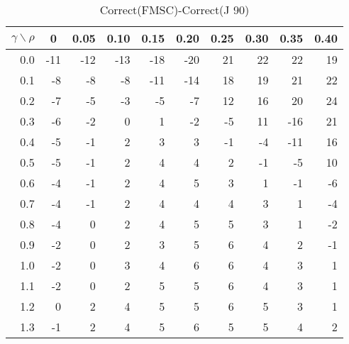 \documentclass[12pt]{article}
\begin{document}
%
\begin{table}[!tbp]
\caption{Correct(FMSC)-Correct(J 90)}
 \begin{center}
 \begin{tabular}{r|rrrrrrrrr}\hline\hline
\multicolumn{1}{c|}{$\gamma\backslash\rho$}&\multicolumn{1}{c}{0}&\multicolumn{1}{c}{0.05}&\multicolumn{1}{c}{0.10}&\multicolumn{1}{c}{0.15}&\multicolumn{1}{c}{0.20}&\multicolumn{1}{c}{0.25}&\multicolumn{1}{c}{0.30}&\multicolumn{1}{c}{0.35}&\multicolumn{1}{c}{0.40}\tabularnewline
\hline
0.0&-11&-12&-13&-18&-20&21&22& 22&19\tabularnewline
0.1& -8& -8& -8&-11&-14&18&19& 21&22\tabularnewline
0.2& -7& -5& -3& -5& -7&12&16& 20&24\tabularnewline
0.3& -6& -2&  0&  1& -2&-5&11&-16&21\tabularnewline
0.4& -5& -1&  2&  3&  3&-1&-4&-11&16\tabularnewline
0.5& -5& -1&  2&  4&  4& 2&-1& -5&10\tabularnewline
0.6& -4& -1&  2&  4&  5& 3& 1& -1&-6\tabularnewline
0.7& -4& -1&  2&  4&  4& 4& 3&  1&-4\tabularnewline
0.8& -4&  0&  2&  4&  5& 5& 3&  1&-2\tabularnewline
0.9& -2&  0&  2&  3&  5& 6& 4&  2&-1\tabularnewline
1.0& -2&  0&  3&  4&  6& 6& 4&  3& 1\tabularnewline
1.1& -2&  0&  2&  5&  5& 6& 4&  3& 1\tabularnewline
1.2&  0&  2&  4&  5&  5& 6& 5&  3& 1\tabularnewline
1.3& -1&  2&  4&  5&  6& 5& 5&  4& 2\tabularnewline
\hline
\end{tabular}

\end{center}

\end{table}
\end{document}
